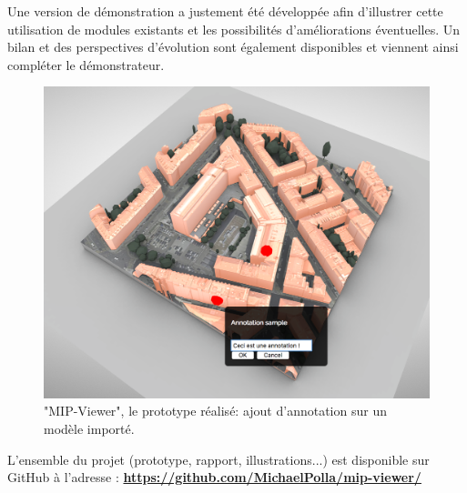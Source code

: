 Une version de démonstration a justement été développée afin d'illustrer cette utilisation de modules existants et les possibilités d'améliorations éventuelles. Un bilan et des perspectives d'évolution sont également disponibles et viennent ainsi compléter le démonstrateur.

\begin{figure}[h]
    \centering
    \includegraphics[width=\linewidth]{Figures/mip-viewer-overview.png}
    \caption{"MIP-Viewer", le prototype réalisé: ajout d'annotation sur un modèle importé.}
    \label{fig:mip-viewer-overview}
\end{figure}

L'ensemble du projet (prototype, rapport, illustrations...) est disponible sur GitHub à l'adresse : \textbf{\url{https://github.com/MichaelPolla/mip-viewer/}}

